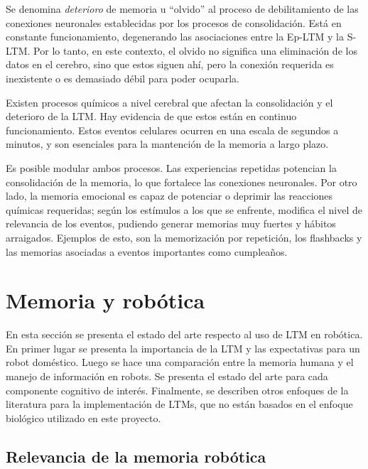 Se denomina \textit{deterioro} de memoria u ``olvido'' al proceso de debilitamiento de las conexiones neuronales establecidas por los procesos de consolidaci\'on. Est\'a en constante funcionamiento, degenerando las asociaciones entre la Ep-LTM y la S-LTM. Por lo tanto, en este contexto, el olvido no significa una eliminaci\'on de los datos en el cerebro, sino que estos siguen ah\'i, pero la conexi\'on requerida es inexistente o es demasiado d\'ebil para poder ocuparla.

Existen procesos qu\'imicos a nivel cerebral que afectan la consolidaci\'on y el deterioro de la LTM. Hay evidencia de que estos est\'an en continuo funcionamiento. Estos eventos celulares ocurren en una escala de segundos a minutos, y son esenciales para la mantenci\'on de la memoria a largo plazo.

Es posible modular ambos procesos. Las experiencias repetidas potencian la consolidaci\'on de la memoria, lo que fortalece las conexiones neuronales. Por otro lado, la memoria emocional es capaz de potenciar o deprimir las reacciones qu\'imicas requeridas; seg\'un los est\'imulos a los que se enfrente, modifica el nivel de relevancia de los eventos, pudiendo generar memorias muy fuertes y h\'abitos arraigados. Ejemplos de esto, son la memorizaci\'on por repetici\'on, los flashbacks y las memorias asociadas a eventos importantes como cumplea\~nos.


\section{Memoria y rob\'otica}

En esta secci\'on se presenta el estado del arte respecto al uso de LTM en rob\'otica. En primer lugar se presenta la importancia de la LTM y las expectativas para un robot dom\'estico. Luego se hace una comparaci\'on entre la memoria humana y el manejo de informaci\'on en robots.  Se presenta el estado del arte para cada componente cognitivo de inter\'es. Finalmente, se describen otros enfoques de la literatura para la implementaci\'on de LTMs, que no est\'an basados en el enfoque biol\'ogico utilizado en este proyecto.


\subsection{Relevancia de la memoria rob\'otica}

